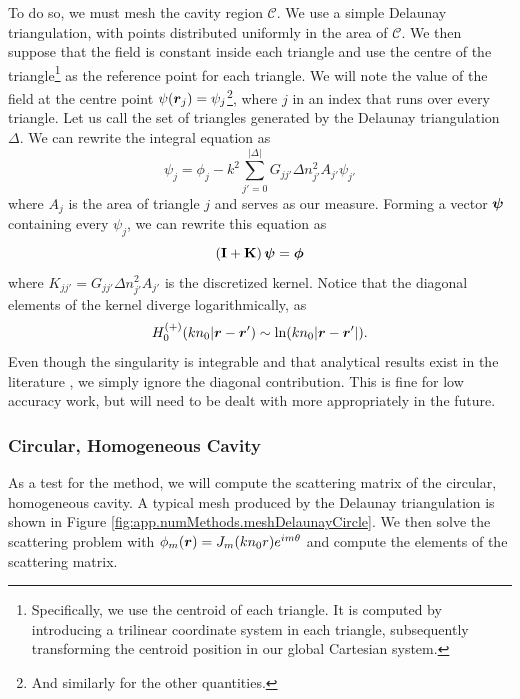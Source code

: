 To do so, we must mesh the cavity region $\mathcal{C}$. We use a simple Delaunay triangulation, 
with points distributed uniformly in the area of $\mathcal{C}$. We then suppose that the field
is constant inside each triangle and use the centre of the triangle\footnote{Specifically, 
we use the centroid of each triangle. It is computed by introducing a trilinear coordinate
system in each triangle, subsequently transforming the centroid position
in our global Cartesian system.} as the reference point
for each triangle. We will note the value of the field at the centre point  
$\psi(\boldsymbol{r}_j)=\psi_j$\footnote{And similarly for the other quantities.}, where $j$
in an index that runs over every triangle. Let us call the set of triangles generated by 
the Delaunay triangulation $\Delta$. We can rewrite the integral equation as
	\begin{equation}
		\psi_j = \phi_j - k^2\sum_{j'=0}^{|\Delta|} G_{jj'}\Delta n^2_{j'}A_{j'}\psi_{j'}
	\end{equation}
where $A_j$ is the area of triangle $j$ and serves as our measure. Forming
a vector $\boldsymbol{\psi}$ containing every $\psi_j$, we can rewrite this 
equation as
	\begin{equation}
		\left(\mathbf{I}+\mathbf{K}\right)\boldsymbol{\psi} = \boldsymbol{\phi}
	\end{equation}
where $K_{jj'} = G_{jj'}\Delta n^2_{j'}A_{j'}$ is the discretized kernel. Notice 
that the diagonal elements of the kernel diverge logarithmically, as
	\begin{equation}
		H_{0}^{(+)}(kn_0|\boldsymbol{r}-\boldsymbol{r}') \sim \ln(kn_0|\boldsymbol{r}-\boldsymbol{r}'|).
	\end{equation}
Even though the singularity is integrable and that analytical results
exist in the literature \cite{YAG1980,VAN1991}, we simply ignore the diagonal
contribution. This is fine for low accuracy work, but will need to be
dealt with more appropriately in the future.

\subsubsection{Circular, Homogeneous Cavity}
As a test for the method, we will compute the scattering
matrix of the circular, homogeneous cavity. A typical mesh 
produced by the Delaunay triangulation is shown in Figure
\ref{fig:app.numMethods.meshDelaunayCircle}. We then solve
the scattering problem with $\phi_m(\boldsymbol{r})=J_m(kn_0r)e^{im\theta}$
and compute the elements of the scattering matrix. 

